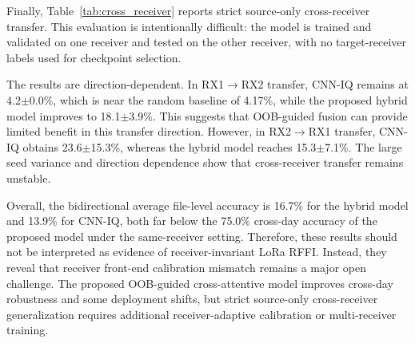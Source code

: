 Finally, Table~\ref{tab:cross_receiver} reports strict source-only cross-receiver transfer. This evaluation is intentionally difficult: the model is trained and validated on one receiver and tested on the other receiver, with no target-receiver labels used for checkpoint selection.



The results are direction-dependent. In RX1$\rightarrow$RX2 transfer, CNN-IQ remains at 4.2$\pm$0.0\%, which is near the random baseline of 4.17\%, while the proposed hybrid model improves to 18.1$\pm$3.9\%. This suggests that OOB-guided fusion can provide limited benefit in this transfer direction. However, in RX2$\rightarrow$RX1 transfer, CNN-IQ obtains 23.6$\pm$15.3\%, whereas the hybrid model reaches 15.3$\pm$7.1\%. The large seed variance and direction dependence show that cross-receiver transfer remains unstable.

Overall, the bidirectional average file-level accuracy is 16.7\% for the hybrid model and 13.9\% for CNN-IQ, both far below the 75.0\% cross-day accuracy of the proposed model under the same-receiver setting. Therefore, these results should not be interpreted as evidence of receiver-invariant LoRa RFFI. Instead, they reveal that receiver front-end calibration mismatch remains a major open challenge. The proposed OOB-guided cross-attentive model improves cross-day robustness and some deployment shifts, but strict source-only cross-receiver generalization requires additional receiver-adaptive calibration or multi-receiver training.
